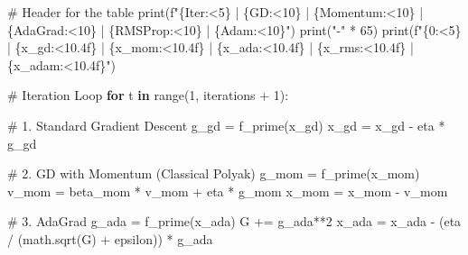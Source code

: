 \documentclass[
  letterpaper,
  DIV=11,
  numbers=noendperiod]{scrreprt}
\newenvironment{Shaded}{\begin{snugshade}}{\end{snugshade}}
\newcommand{\BuiltInTok}[1]{\textcolor[rgb]{0.00,0.23,0.31}{#1}}
\newcommand{\CommentTok}[1]{\textcolor[rgb]{0.37,0.37,0.37}{#1}}
\newcommand{\ControlFlowTok}[1]{\textcolor[rgb]{0.00,0.23,0.31}{\textbf{#1}}}
\newcommand{\DecValTok}[1]{\textcolor[rgb]{0.68,0.00,0.00}{#1}}
\newcommand{\KeywordTok}[1]{\textcolor[rgb]{0.00,0.23,0.31}{\textbf{#1}}}
\newcommand{\NormalTok}[1]{\textcolor[rgb]{0.00,0.23,0.31}{#1}}
\newcommand{\OperatorTok}[1]{\textcolor[rgb]{0.37,0.37,0.37}{#1}}
\newcommand{\SpecialCharTok}[1]{\textcolor[rgb]{0.37,0.37,0.37}{#1}}
\newcommand{\SpecialStringTok}[1]{\textcolor[rgb]{0.13,0.47,0.30}{#1}}
\newcommand{\StringTok}[1]{\textcolor[rgb]{0.13,0.47,0.30}{#1}}
\begin{document}
\begin{Shaded}
\begin{Highlighting}[]
\CommentTok{\# Header for the table}
\BuiltInTok{print}\NormalTok{(}\SpecialStringTok{f"}\SpecialCharTok{\{}\StringTok{\textquotesingle{}Iter\textquotesingle{}}\SpecialCharTok{:\textless{}5\}}\SpecialStringTok{ | }\SpecialCharTok{\{}\StringTok{\textquotesingle{}GD\textquotesingle{}}\SpecialCharTok{:\textless{}10\}}\SpecialStringTok{ | }\SpecialCharTok{\{}\StringTok{\textquotesingle{}Momentum\textquotesingle{}}\SpecialCharTok{:\textless{}10\}}\SpecialStringTok{ | }\SpecialCharTok{\{}\StringTok{\textquotesingle{}AdaGrad\textquotesingle{}}\SpecialCharTok{:\textless{}10\}}\SpecialStringTok{ | }\SpecialCharTok{\{}\StringTok{\textquotesingle{}RMSProp\textquotesingle{}}\SpecialCharTok{:\textless{}10\}}\SpecialStringTok{ | }\SpecialCharTok{\{}\StringTok{\textquotesingle{}Adam\textquotesingle{}}\SpecialCharTok{:\textless{}10\}}\SpecialStringTok{"}\NormalTok{)}
\BuiltInTok{print}\NormalTok{(}\StringTok{"{-}"} \OperatorTok{*} \DecValTok{65}\NormalTok{)}
\BuiltInTok{print}\NormalTok{(}\SpecialStringTok{f"}\SpecialCharTok{\{}\DecValTok{0}\SpecialCharTok{:\textless{}5\}}\SpecialStringTok{ | }\SpecialCharTok{\{}\NormalTok{x\_gd}\SpecialCharTok{:\textless{}10.4f\}}\SpecialStringTok{ | }\SpecialCharTok{\{}\NormalTok{x\_mom}\SpecialCharTok{:\textless{}10.4f\}}\SpecialStringTok{ | }\SpecialCharTok{\{}\NormalTok{x\_ada}\SpecialCharTok{:\textless{}10.4f\}}\SpecialStringTok{ | }\SpecialCharTok{\{}\NormalTok{x\_rms}\SpecialCharTok{:\textless{}10.4f\}}\SpecialStringTok{ | }\SpecialCharTok{\{}\NormalTok{x\_adam}\SpecialCharTok{:\textless{}10.4f\}}\SpecialStringTok{"}\NormalTok{)}

\CommentTok{\# Iteration Loop}
\ControlFlowTok{for}\NormalTok{ t }\KeywordTok{in} \BuiltInTok{range}\NormalTok{(}\DecValTok{1}\NormalTok{, iterations }\OperatorTok{+} \DecValTok{1}\NormalTok{):}
    
    \CommentTok{\# 1. Standard Gradient Descent}
\NormalTok{    g\_gd }\OperatorTok{=}\NormalTok{ f\_prime(x\_gd)}
\NormalTok{    x\_gd }\OperatorTok{=}\NormalTok{ x\_gd }\OperatorTok{{-}}\NormalTok{ eta }\OperatorTok{*}\NormalTok{ g\_gd}
    
    \CommentTok{\# 2. GD with Momentum (Classical Polyak)}
\NormalTok{    g\_mom }\OperatorTok{=}\NormalTok{ f\_prime(x\_mom)}
\NormalTok{    v\_mom }\OperatorTok{=}\NormalTok{ beta\_mom }\OperatorTok{*}\NormalTok{ v\_mom }\OperatorTok{+}\NormalTok{ eta }\OperatorTok{*}\NormalTok{ g\_mom}
\NormalTok{    x\_mom }\OperatorTok{=}\NormalTok{ x\_mom }\OperatorTok{{-}}\NormalTok{ v\_mom}
    
    \CommentTok{\# 3. AdaGrad}
\NormalTok{    g\_ada }\OperatorTok{=}\NormalTok{ f\_prime(x\_ada)}
\NormalTok{    G }\OperatorTok{+=}\NormalTok{ g\_ada}\OperatorTok{**}\DecValTok{2}
\NormalTok{    x\_ada }\OperatorTok{=}\NormalTok{ x\_ada }\OperatorTok{{-}}\NormalTok{ (eta }\OperatorTok{/}\NormalTok{ (math.sqrt(G) }\OperatorTok{+}\NormalTok{ epsilon)) }\OperatorTok{*}\NormalTok{ g\_ada}
    

\end{Highlighting}
\end{Shaded}
\end{document}
